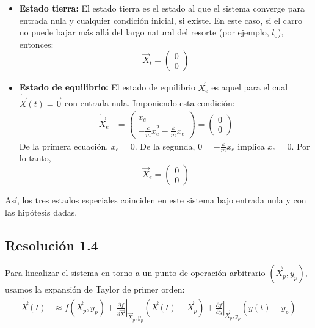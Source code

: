 \documentclass[
  11pt,
  letterpaper,
   addpoints,
   answers
  ]{exam}
\begin{document}
\begin{questions}
\begin{solution}
\begin{itemize}
\item \textbf{Estado tierra:} El estado tierra es el estado al que el sistema converge para entrada nula y cualquier condición inicial, si existe. En este caso, si el carro no puede bajar más allá del largo natural del resorte (por ejemplo, $l_0$), entonces:
\begin{equation}
  \vec{X}_t = \begin{pmatrix} 0 \\ 0 \end{pmatrix}
\end{equation}
	\item \textbf{Estado de equilibrio:} El estado de equilibrio $\vec{X}_e$ es aquel para el cual $\dot{\vec{X}}(t) = \vec{0}$ con entrada nula. Imponiendo esta condición:
\begin{align}
  \dot{\vec{X}}_e &= \begin{pmatrix} \dot{x}_e \\ -\frac{c}{m} \dot{x}_e^2 - \frac{k}{m} x_e \end{pmatrix} = \begin{pmatrix} 0 \\ 0 \end{pmatrix}
\end{align}
De la primera ecuación, $\dot{x}_e = 0$. De la segunda, $0 = -\frac{k}{m} x_e$ implica $x_e = 0$.
Por lo tanto,
\begin{equation}
  \vec{X}_e = \begin{pmatrix} 0 \\ 0 \end{pmatrix}
\end{equation}
\end{itemize}
Así, los tres estados especiales coinciden en este sistema bajo entrada nula y con las hipótesis dadas.

\subsection*{Resolución 1.4}

Para linealizar el sistema en torno a un punto de operación arbitrario $\left(\vec{X}_p, y_p\right)$, usamos la expansión de Taylor de primer orden:
\begin{align}
  \dot{\vec{X}}(t) &\approx f(\vec{X}_p, y_p) + \left.\frac{\partial f}{\partial \vec{X}}\right|_{\vec{X}_p, y_p} (\vec{X}(t) - \vec{X}_p) + \left.\frac{\partial f}{\partial y}\right|_{\vec{X}_p, y_p} (y(t) - y_p)
\end{align}


\end{solution}
\end{questions}
\end{document}

